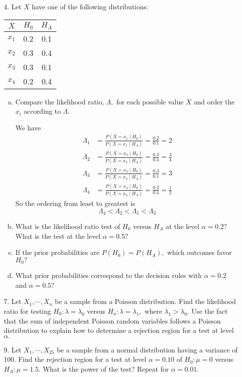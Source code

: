 \documentclass{article}
\begin{document}
\begin{itemize}
	\item[4.] Let $X$ have one of the following distributions:
		\begin{center}
			\begin{tabular}{ccc}
				$X$ & $H_0$ & $H_A$ \\
				\hline
				$x_1$ & 0.2 & 0.1 \\
				$x_2$ & 0.3 & 0.4 \\
				$x_3$ & 0.3 & 0.1 \\
				$x_4$ & 0.2 & 0.4
			\end{tabular}
		\end{center}

		\begin{enumerate}[a.]
			\item Compare the likelihood ratio, $\Lambda,$ for each possible value $X$ and order the $x_i$ according to $\Lambda.$
				\begin{soln}
					We have 
					\begin{align*}
						\Lambda_1 &= \frac{P(X=x_1\mid H_0)}{P(X=x_1\mid H_A)} = \frac{0.2}{0.1} = 2 \\
						\Lambda_2 &= \frac{P(X=x_2\mid H_0)}{P(X=x_2\mid H_A)}=\frac{0.3}{0.4}=\frac{3}{4} \\
						\Lambda_3 &= \frac{P(X=x_3\mid H_0)}{P(X=x_3\mid H_A)} = \frac{0.3}{0.1} = 3 \\
						\Lambda_4 &= \frac{P(X=x_4\mid H_0)}{P(X=x_4\mid H_A)} = \frac{0.2}{0.4}=\frac{1}{2}
					\end{align*}
					So the ordering from least to greatest is \[\Lambda_4<\Lambda_2<\Lambda_1<\Lambda_3\]
				\end{soln}

			\item What is the likelihood ratio test of $H_0$ versus $H_A$ at the level $\alpha=0.2?$ What is the test at the level $\alpha=0.5?$

			\item If the prior probabilities are $P(H_0)=P(H_A),$ which outcomes favor $H_0?$

			\item What prior probabilities correspond to the decision rules with $\alpha=0.2$ and $\alpha=0.5?$
				
		\end{enumerate}

	\item[7.] Let $X_1, \cdots, X_n$ be a sample from a Poisson distribution. Find the likelihood ratio for testing $H_0:\lambda=\lambda_0$ versus $H_a:\lambda=\lambda_1,$ where $\lambda_1>\lambda_0.$ Use the fact that the sum of independent Poisson random variables follows a Poisson distribution to explain how to determine a rejection region for a test at level $\alpha.$

	\item[9.] Let $X_1,\cdots, X_{25}$ be a sample from a normal distribution having a variance of 100. Find the rejection region for a test at level $\alpha=0.10$ of $H_0:\mu=0$ versus $H_A: \mu=1.5.$ What is the power of the test? Repeat for $\alpha=0.01.$
		
\end{itemize}
\end{document}
